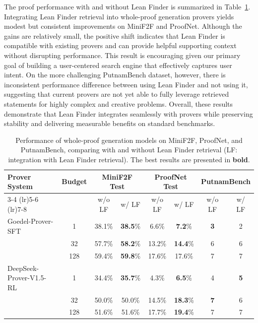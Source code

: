 \documentclass{article} %
\begin{document}
The proof performance with and without Lean Finder is summarized in Table~\ref{table:whole_proof_result}. 
Integrating Lean Finder retrieval into whole-proof generation provers yields modest but consistent improvements on MiniF2F and ProofNet. Although the gains are relatively small, the positive shift indicates that Lean Finder is compatible with existing provers and can provide helpful supporting context without disrupting performance. This result is encouraging given our primary goal of building a user-centered search engine that effectively captures user intent. On the more challenging PutnamBench dataset, however, there is inconsistent performance difference between using Lean Finder and not using it, suggesting that current provers are not yet able to fully leverage retrieved statements for highly complex and creative problems. Overall, these results demonstrate that Lean Finder integrates seamlessly with provers while preserving stability and delivering measurable benefits on standard benchmarks.


\begin{table}[h!]
\captionsetup{font=small}
\caption{Performance of whole-proof generation models on MiniF2F, ProofNet, and PutnamBench, comparing with and without Lean Finder retrieval (LF: integration with Lean Finder retrieval). The best results are presented in \textbf{bold}.}
\vspace{-1em}
\label{table:whole_proof_result}
\centering
\setlength{\tabcolsep}{4pt}
\begin{tabular}{lccccccc}
\toprule
Prover System & Budget & \multicolumn{2}{c}{MiniF2F Test} & \multicolumn{2}{c}{ProofNet Test} & \multicolumn{2}{c}{PutnamBench}\\
\cmidrule(lr){3-4} \cmidrule(lr){5-6} \cmidrule(lr){7-8}
              &        & w/o LF & w/ LF & w/o LF & w/ LF & w/o LF & w/ LF\\
\midrule
Goedel-Prover-SFT          & 1   & 38.1\% & \textbf{38.5}\% & 6.6\% & \textbf{7.2}\% & \textbf{3} & 2\\
                         & 32  & 57.7\% & \textbf{58.2}\% & 13.2\% & \textbf{14.4}\% & 6 & 6\\
                         & 128 & 59.4\% & \textbf{59.8}\% & 17.6\% & 17.6\% & 7 & 7\\
\midrule
DeepSeek-Prover-V1.5-RL \  & 1   & 34.4\% & \textbf{35.7}\% & 4.3\% & \textbf{6.5}\% & 4 & \textbf{5}\\
                         & 32  & 50.0\% & 50.0\% & 14.5\% & \textbf{18.3}\% & \textbf{7} & 6\\
                         & 128 & 51.6\% & 51.6\% & 17.7\% & \textbf{19.4}\% & 7 & 7\\
\bottomrule
\end{tabular}
\end{table}
\end{document}

